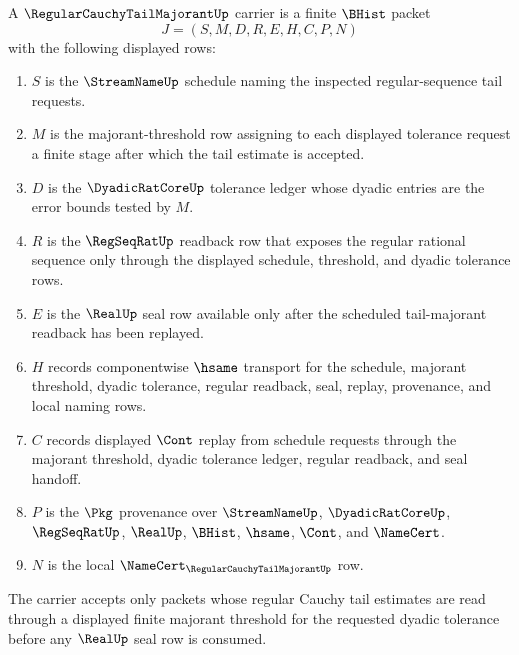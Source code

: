 \begin{definition}
\label{def:regular-cauchy-tail-majorant-carrier}
A $\RegularCauchyTailMajorantUp$ carrier is a finite $\BHist$ packet
$$
J=(S,M,D,R,E,H,C,P,N)
$$
with the following displayed rows:
\begin{enumerate}
\item $S$ is the $\StreamNameUp$ schedule naming the inspected regular-sequence tail requests.
\item $M$ is the majorant-threshold row assigning to each displayed tolerance request a finite stage after which the tail estimate is accepted.
\item $D$ is the $\DyadicRatCoreUp$ tolerance ledger whose dyadic entries are the error bounds tested by $M$.
\item $R$ is the $\RegSeqRatUp$ readback row that exposes the regular rational sequence only through the displayed schedule, threshold, and dyadic tolerance rows.
\item $E$ is the $\RealUp$ seal row available only after the scheduled tail-majorant readback has been replayed.
\item $H$ records componentwise $\hsame$ transport for the schedule, majorant threshold, dyadic tolerance, regular readback, seal, replay, provenance, and local naming rows.
\item $C$ records displayed $\Cont$ replay from schedule requests through the majorant threshold, dyadic tolerance ledger, regular readback, and seal handoff.
\item $P$ is the $\Pkg$ provenance over $\StreamNameUp$, $\DyadicRatCoreUp$, $\RegSeqRatUp$, $\RealUp$, $\BHist$, $\hsame$, $\Cont$, and $\NameCert$.
\item $N$ is the local $\NameCert_{\RegularCauchyTailMajorantUp}$ row.
\end{enumerate}
The carrier accepts only packets whose regular Cauchy tail estimates are read through a displayed finite majorant threshold for the requested dyadic tolerance before any $\RealUp$ seal row is consumed.
\end{definition}

